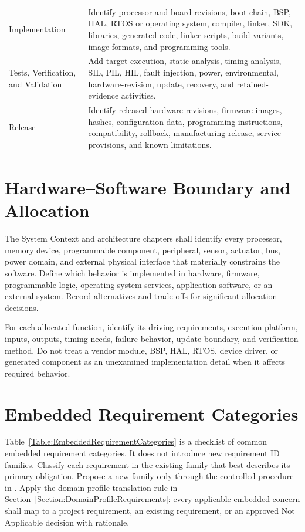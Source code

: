 \begin{tabularx}{\linewidth}{L{4.2cm}Y}
Implementation & Identify processor and board revisions, boot chain, BSP, HAL,
RTOS or operating system, compiler, linker, SDK, libraries, generated code,
linker scripts, build variants, image formats, and programming tools.\\
Tests, Verification, and Validation & Add target execution, static analysis,
timing analysis, SIL, PIL, HIL, fault injection, power, environmental,
hardware-revision, update, recovery, and retained-evidence activities.\\
Release & Identify released hardware revisions, firmware images, hashes,
configuration data, programming instructions, compatibility, rollback,
manufacturing release, service provisions, and known limitations.\\
\end{tabularx}
\normalsize

\section{Hardware--Software Boundary and Allocation}
The System Context and architecture chapters shall identify every processor,
memory device, programmable component, peripheral, sensor, actuator, bus,
power domain, and external physical interface that materially constrains the
software. Define which behavior is implemented in hardware, firmware,
programmable logic, operating-system services, application software, or an
external system. Record alternatives and trade-offs for significant
allocation decisions.

For each allocated function, identify its driving requirements, execution
platform, inputs, outputs, timing needs, failure behavior, update boundary,
and verification method. Do not treat a vendor module, BSP, HAL, RTOS, device
driver, or generated component as an unexamined implementation detail when it
affects required behavior.

\section{Embedded Requirement Categories}
Table~\ref{Table:EmbeddedRequirementCategories} is a checklist of common
embedded requirement categories. It does not introduce new requirement ID
families. Classify each requirement in the existing family that best describes
its primary obligation. Propose a new family only through the controlled
procedure in . Apply the domain-profile translation
rule in Section~\ref{Section:DomainProfileRequirements}: every applicable
embedded concern shall map to a project requirement, an existing requirement,
or an approved Not Applicable decision with rationale.

